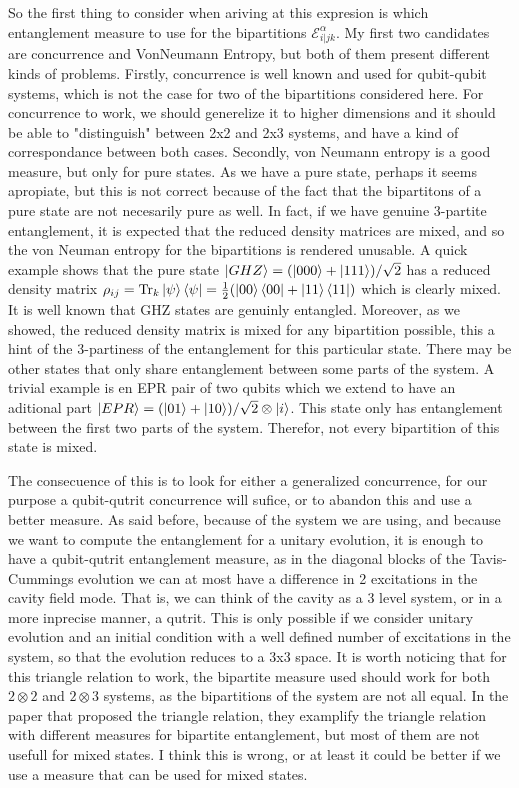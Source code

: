 So the first thing to consider when ariving at this expresion is which entanglement measure to use for the bipartitions $\mathcal{E}^\alpha_{i|jk}$. My first two candidates are concurrence and VonNeumann Entropy, but both of them present different kinds of problems. Firstly, concurrence is well known and used for qubit-qubit systems, which is not the case for two of the bipartitions considered here. For concurrence to work, we should generelize it to higher dimensions and it should be able to "distinguish" between 2x2 and 2x3 systems, and have a kind of correspondance between both cases. Secondly, von Neumann entropy is a good measure, but only for pure states. As we have a pure state, perhaps it seems apropiate, but this is not correct because of the fact that the bipartitons of a pure state are not necesarily pure as well. In fact, if we have genuine 3-partite entanglement, it is expected that the reduced density matrices are mixed, and so the von Neuman entropy for the bipartitions is rendered unusable. A quick example shows that the pure state $\ket{GHZ}=(\ket{000}+\ket{111})/\sqrt{2}$ has a reduced density matrix $\rho_{ij}=\text{Tr}_k\ket{\psi}\bra{\psi}=\frac{1}{2}(\ket{00}\bra{00}+\ket{11}\bra{11})$ which is clearly mixed. It is well known that GHZ states are genuinly entangled. Moreover, as we showed, the reduced density matrix is mixed for any bipartition possible, this a hint of the 3-partiness of the entanglement for this particular state. There may be other states that only share entanglement between some parts of the system. A trivial example is en EPR pair of two qubits which we extend to have an aditional part $\ket{EPR}=(\ket{01}+\ket{10})/\sqrt{2}\otimes\ket{i}$. This state only has entanglement between the first two parts of the system. Therefor, not every bipartition of this state is mixed.

The consecuence of this is to look for either a generalized concurrence, for our purpose a qubit-qutrit concurrence will sufice, or to abandon this and use a better measure. As said before, because of the system we are using, and because we want to compute the entanglement for a unitary evolution, it is enough to have a qubit-qutrit entanglement measure, as in the diagonal blocks of the Tavis-Cummings evolution we can at most have a difference in 2 excitations in the cavity field mode. That is, we can think of the cavity as a 3 level system, or in a more inprecise manner, a qutrit. This is only possible if we consider unitary evolution and an initial condition with a well defined number of excitations in the system, so that the evolution reduces to a 3x3 space. It is worth noticing that for this triangle relation to work, the bipartite measure used should work for both $2\otimes2$ and $2\otimes3$ systems, as the bipartitions of the system are not all equal. In the paper that proposed the triangle relation, they examplify the triangle relation with different measures for bipartite entanglement, but most of them are not usefull for mixed states. I think this is wrong, or at least it could be better if we use a measure that can be used for mixed states. 


